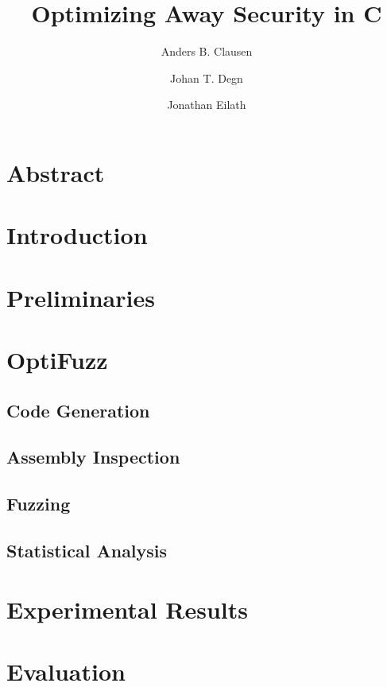 \documentclass[10pt]{article}
\title{
  Optimizing Away Security in C
}
\author{Anders B. Clausen \and Johan T. Degn \and Jonathan Eilath}
\begin{document}
\maketitle
\thispagestyle{empty}

\section*{Abstract}

\section{Introduction}


\section{Preliminaries}


\section{OptiFuzz}

\subsection{Code Generation}

\subsection{Assembly Inspection}

\subsection{Fuzzing}

\subsection{Statistical Analysis}


\section{Experimental Results}


\section{Evaluation}

\end{document}
